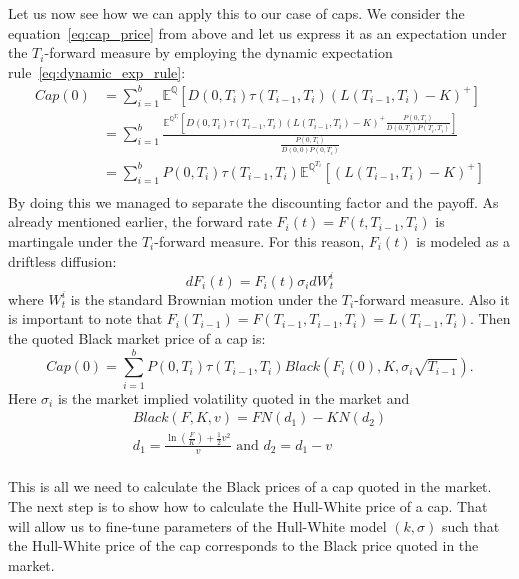 \documentclass[titlepage, 12pt]{article}
\newcommand{\condexpec}[2]{\mathbb{E}^\mathbb{#1}\left[#2\right]}
\begin{document}
	Let us now see how we can apply this to our case of caps. We consider the equation~\eqref{eq:cap_price} from above and let us express it as an expectation under the $T_i$-forward measure by employing the dynamic expectation rule~\eqref{eq:dynamic_exp_rule}:
	\begin{equation}
		\begin{split}
			Cap(0) &= \sum_{i=1}^b \condexpec{Q}{D(0,T_i)\tau(T_{i-1}, T_i)\left(L(T_{i-1}, T_i) - K\right)^+} \\
			&= \sum_{i=1}^b \frac{\condexpec{Q^\mathit{T_i}}{D(0,T_i)\tau(T_{i-1}, T_i)\left(L(T_{i-1}, T_i) - K\right)^+\frac{P(0,T_i)}{D(0,T_i)P(T_i,T_i)}}}{\frac{P(0,T_i)}{D(0,0)P(0,T_i)}} \\
			&= \sum_{i=1}^b P(0,T_i)\tau(T_{i-1}, T_i)\condexpec{Q^\mathit{T_i}}{\left(L(T_{i-1}, T_i) - K\right)^+} \\
		\end{split}
	\end{equation}
	By doing this we managed to separate the discounting factor and the payoff. As already mentioned earlier, the forward rate $F_i(t)=F(t,T_{i-1}, T_i)$ is martingale under the $T_i$-forward measure. For this reason, $F_i(t)$ is modeled as a driftless diffusion:
	\begin{equation}
		dF_i(t) = F_i(t)\sigma_idW^i_t
	\end{equation}
	where $W^i_t$ is the standard Brownian motion under the $T_i$-forward measure. Also it is important to note that $F_i(T_{i-1}) = F(T_{i-1}, T_{i-1}, T_i) = L(T_{i-1}, T_i)$. Then the quoted Black market price of a cap is:
	\begin{equation}
		Cap(0) = \sum_{i=1}^b P(0,T_i)\tau(T_{i-1}, T_i)Black\left(F_i(0), K, \sigma_i\sqrt{T_{i-1}}\right).
	\end{equation}
	Here $\sigma_i$ is the market implied volatility quoted in the market and
	\begin{equation}
		\begin{split}
			Black(F,K,v) = FN(d_1) - KN(d_2) \\
			d_1 = \frac{\ln\left(\frac{F}{K}\right)+\frac{1}{2}v^2}{v} \text{ and } d_2 = d_1 - v\\
		\end{split}
	\end{equation}
	
	This is all we need to calculate the Black prices of a cap quoted in the market. The next step is to show how to calculate the Hull-White price of a cap. That will allow us to fine-tune parameters of the Hull-White model $(k,\sigma)$ such that the Hull-White price of the cap corresponds to the Black price quoted in the market. 
	
\end{document}
